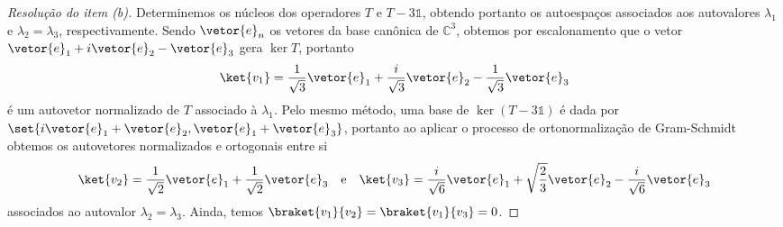 \begin{proof}[Resolução do item (b)]
    Determinemos os núcleos dos operadores \(T\) e \(T - 3\mathds{1}\), obtendo portanto os autoespaços associados aos autovalores \(\lambda_1\) e \(\lambda_2=\lambda_3\), respectivamente. Sendo \(\vetor{e}_n\) os vetores da base canônica de \(\mathbb{C}^3\), obtemos por escalonamento que o vetor \(\vetor{e}_1 + i \vetor{e}_2 - \vetor{e}_3\) gera \(\ker{T}\), portanto
    \begin{equation*}
        \ket{v_1} = \frac{1}{\sqrt{3}}\vetor{e}_1 + \frac{i}{\sqrt{3}}\vetor{e}_2 - \frac{1}{\sqrt{3}}\vetor{e}_3
    \end{equation*}
    é um autovetor normalizado de \(T\) associado à \(\lambda_1\). Pelo mesmo método, uma base de \(\ker(T - 3\mathds{1})\) é dada por \(\set{i\vetor{e}_1 + \vetor{e}_2, \vetor{e}_1 + \vetor{e}_3}\), portanto ao aplicar o processo de ortonormalização de Gram-Schmidt obtemos os autovetores normalizados e ortogonais entre si
    \begin{equation*}
        \ket{v_2} = \frac{1}{\sqrt{2}}\vetor{e}_1 + \frac{1}{\sqrt{2}}\vetor{e}_3\quad\text{e}\quad
        \ket{v_3} = \frac{i}{\sqrt{6}}\vetor{e}_1 + \sqrt{\frac{2}{3}}\vetor{e}_2 - \frac{i}{\sqrt{6}}\vetor{e}_3
    \end{equation*}
    associados ao autovalor \(\lambda_2 = \lambda_3\). Ainda, temos \(\braket{v_1}{v_2} = \braket{v_1}{v_3} = 0\).


\end{proof}
